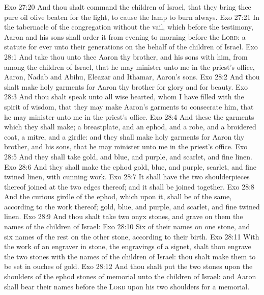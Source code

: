 \vs Exo 27:20 And thou shalt command the children of Israel, that they bring thee pure oil olive beaten for the light, to cause the lamp to burn always.
\vs Exo 27:21 In the tabernacle of the congregation without the vail, which  before the testimony, Aaron and his sons shall order it from evening to morning before the \textsc{Lord}:  a statute for ever unto their generations on the behalf of the children of Israel.
\vs Exo 28:1 And take thou unto thee Aaron thy brother, and his sons with him, from among the children of Israel, that he may minister unto me in the priest's office,  Aaron, Nadab and Abihu, Eleazar and Ithamar, Aaron's sons.
\vs Exo 28:2 And thou shalt make holy garments for Aaron thy brother for glory and for beauty.
\vs Exo 28:3 And thou shalt speak unto all  wise hearted, whom I have filled with the spirit of wisdom, that they may make Aaron's garments to consecrate him, that he may minister unto me in the priest's office.
\vs Exo 28:4 And these  the garments which they shall make; a breastplate, and an ephod, and a robe, and a broidered coat, a mitre, and a girdle: and they shall make holy garments for Aaron thy brother, and his sons, that he may minister unto me in the priest's office.
\vs Exo 28:5 And they shall take gold, and blue, and purple, and scarlet, and fine linen.
\vs Exo 28:6 And they shall make the ephod  gold,  blue, and  purple,  scarlet, and fine twined linen, with cunning work.
\vs Exo 28:7 It shall have the two shoulderpieces thereof joined at the two edges thereof; and  it shall be joined together.
\vs Exo 28:8 And the curious girdle of the ephod, which  upon it, shall be of the same, according to the work thereof;  gold,  blue, and purple, and scarlet, and fine twined linen.
\vs Exo 28:9 And thou shalt take two onyx stones, and grave on them the names of the children of Israel:
\vs Exo 28:10 Six of their names on one stone, and  six names of the rest on the other stone, according to their birth.
\vs Exo 28:11 With the work of an engraver in stone,  the engravings of a signet, shalt thou engrave the two stones with the names of the children of Israel: thou shalt make them to be set in ouches of gold.
\vs Exo 28:12 And thou shalt put the two stones upon the shoulders of the ephod  stones of memorial unto the children of Israel: and Aaron shall bear their names before the \textsc{Lord} upon his two shoulders for a memorial.
